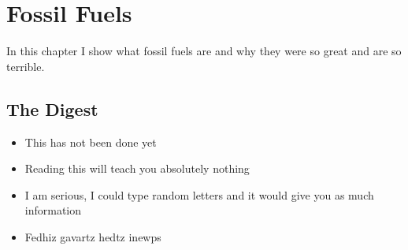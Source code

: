 \setchapterpreamble[u]{\margintoc}
\chapter{Fossil Fuels}

In this chapter I show what fossil fuels are and why they were so great and are so terrible.


\blindtext


\section{The Digest}


\begin{kaoboxgreen}[frametitle=Main Takeaways]

\begin{itemize}
\item This has not been done yet
\item Reading this will teach you absolutely nothing
\item I am serious, I could type random letters and it would give you as much information
\item Fedhiz gavartz hedtz inewps
\end{itemize}
  
\end{kaoboxgreen}